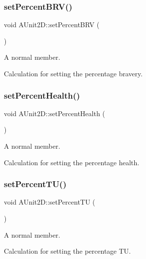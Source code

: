 \subsubsection{\texorpdfstring{set\+Percent\+B\+R\+V()}{setPercentBRV()}}
{\footnotesize\ttfamily void A\+Unit2\+D\+::set\+Percent\+B\+RV (\begin{DoxyParamCaption}{ }\end{DoxyParamCaption})}



A normal member. 

Calculation for setting the percentage bravery. \hypertarget{class_a_unit2_d_af13c789a87a18daa455387f44d84d333}{}\label{class_a_unit2_d_af13c789a87a18daa455387f44d84d333} 
\subsubsection{\texorpdfstring{set\+Percent\+Health()}{setPercentHealth()}}
{\footnotesize\ttfamily void A\+Unit2\+D\+::set\+Percent\+Health (\begin{DoxyParamCaption}{ }\end{DoxyParamCaption})}



A normal member. 

Calculation for setting the percentage health. \hypertarget{class_a_unit2_d_a0f93d2f4547813149e5b46530dcaba67}{}\label{class_a_unit2_d_a0f93d2f4547813149e5b46530dcaba67} 
\subsubsection{\texorpdfstring{set\+Percent\+T\+U()}{setPercentTU()}}
{\footnotesize\ttfamily void A\+Unit2\+D\+::set\+Percent\+TU (\begin{DoxyParamCaption}{ }\end{DoxyParamCaption})}



A normal member. 

Calculation for setting the percentage TU. \hypertarget{class_a_unit2_d_a1f444ba247643672bec2a87beec14fb0}{}\label{class_a_unit2_d_a1f444ba247643672bec2a87beec14fb0} 
